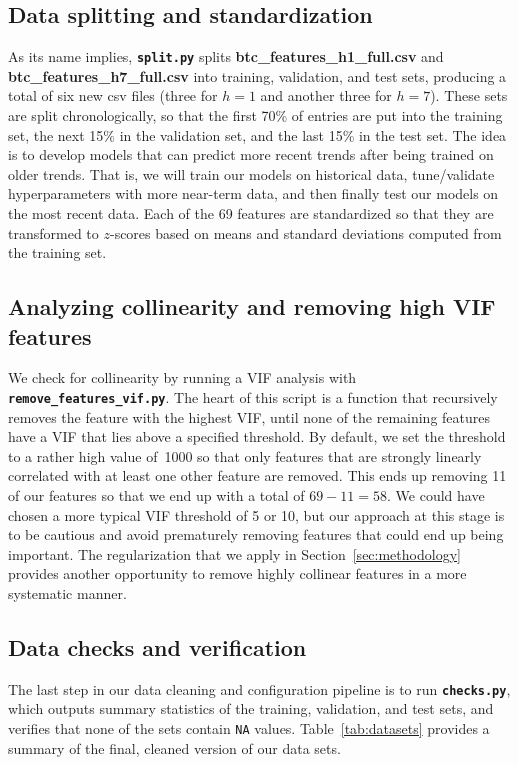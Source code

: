 \documentclass{article}
\begin{document}
\subsection{Data splitting and standardization}
As its name implies, \textbf{\texttt{split.py}} splits \textbf{btc\_features\_h1\_full.csv} and \textbf{btc\_features\_h7\_full.csv} into training, validation, and test sets, producing a total of six new csv files (three for $h=1$ and another three for $h=7$). These sets are split chronologically, so that the first 70\% of entries are put into the training set, the next 15\% in the validation set, and the last 15\% in the test set. The idea is to develop models that can predict more recent trends after being trained on older trends. That is, we will train our models on historical data, tune/validate hyperparameters with more near-term data, and then finally test our models on the most recent data. Each of the 69 features are standardized so that they are transformed to $z$-scores based on means and standard deviations computed from the training set.

\subsection{Analyzing collinearity and removing high VIF features}
We check for collinearity by running a VIF analysis with \textbf{\texttt{remove\_features\_vif.py}}. The heart of this script is a function that recursively removes the feature with the highest VIF, until none of the remaining features have a VIF that lies above a specified threshold. By default, we set the threshold to a rather high value of~1000 so that only features that are strongly linearly correlated with at least one other feature are removed. This ends up removing 11 of our features so that we end up with a total of $69 - 11 = 58$. We could have chosen a more typical VIF threshold of 5 or 10, but our approach at this stage is to be cautious and avoid prematurely removing features that could end up being important. The regularization that we apply in Section~\ref{sec:methodology} provides another opportunity to remove highly collinear features in a more systematic manner.

\subsection{Data checks and verification}
The last step in our data cleaning and configuration pipeline is to run \textbf{\texttt{checks.py}}, which outputs summary statistics of the training, validation, and test sets, and verifies that none of the sets contain \texttt{NA} values. Table~\ref{tab:datasets} provides a summary of the final, cleaned version of our data sets. 
\end{document}
